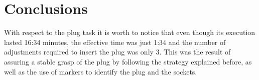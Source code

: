 \section{Conclusions}
	\label{sec:conclusions}
	
	With respect to the plug task it is worth to notice that even though its execution
	lasted 16:34 minutes, the effective time was just 1:34 and the number of adjustments
	required to insert the plug was only 3.
	This was the result of assuring a stable grasp of the plug by following the strategy
	explained before, as well as the use of markers to identify the plug and the sockets.